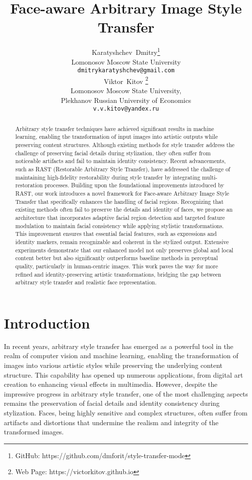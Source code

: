 \documentclass{article}
\title{Face-aware Arbitrary Image Style Transfer}
\author{ Karatyshchev~Dmitry\thanks{GitHub: https://github.com/dmforit/style-transfer-mode} \\
	Lomonosov Moscow State University\\
	\texttt{dmitrykaratyshchev@gmail.com} \\
	\And
	Viktor~Kitov \thanks{Web Page: https://victorkitov.github.io} \\
	Lomonosov Moscow State University,\\
	Plekhanov Russian University of Economics\\
	\texttt{v.v.kitov@yandex.ru} \\
}
\date{}
\begin{document}
\maketitle

\begin{abstract}
Arbitrary style transfer techniques have achieved significant results in machine learning, enabling the transformation of input images into artistic outputs while preserving content structures. Although existing methods for style transfer address the challenge of preserving facial details during stylization, they often suffer from noticeable artifacts and fail to maintain identity consistency. Recent advancements, such as RAST (Restorable Arbitrary Style Transfer), have addressed the challenge of maintaining high-fidelity restorability during style transfer by integrating multi-restoration processes. Building upon the foundational improvements introduced by RAST, our work introduces a novel framework for Face-aware Arbitrary Image Style Transfer that specifically enhances the handling of facial regions. Recognizing that existing methods often fail to preserve the details and identity of faces, we propose an architecture that incorporates adaptive facial region detection and targeted feature modulation to maintain facial consistency while applying stylistic transformations. This improvement ensures that essential facial features, such as expressions and identity markers, remain recognizable and coherent in the stylized output. Extensive experiments demonstrate that our enhanced model not only preserves global and local content better but also significantly outperforms baseline methods in perceptual quality, particularly in human-centric images. This work paves the way for more refined and identity-preserving artistic transformations, bridging the gap between arbitrary style transfer and realistic face representation.
\end{abstract}


\section{Introduction}
\label{sec:introduction}

In recent years, arbitrary style transfer has emerged as a powerful tool in the realm of computer vision and machine learning, enabling the transformation of images into various artistic styles while preserving the underlying content structure. This capability has opened up numerous applications, from digital art creation to enhancing visual effects in multimedia. However, despite the impressive progress in arbitrary style transfer, one of the most challenging aspects remains the preservation of facial details and identity consistency during stylization. Faces, being highly sensitive and complex structures, often suffer from artifacts and distortions that undermine the realism and integrity of the transformed images.
\end{document}
